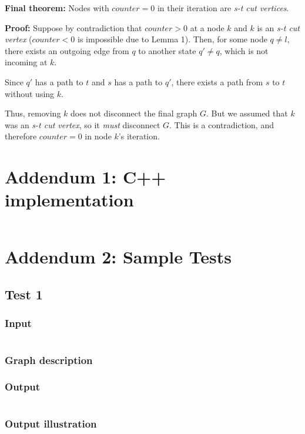 \documentclass{article}
\begin{document}
\begin{itemize}
\textbf{Final theorem:} Nodes with $counter = 0$ in their iteration are \emph{s-t cut vertices}.

\textbf{Proof:} Suppose by contradiction that $counter > 0$ at a node $k$ and $k$ is an \emph{s-t cut vertex} ($counter < 0$ is impossible due to Lemma 1). Then, for some node $q \neq l$, there exists an outgoing edge from $q$ to another state $q' \neq q$, which is not incoming at $k$.

Since $q'$ has a path to $t$ and $s$ has a path to $q'$, there exists a path from $s$ to $t$ without using $k$. 

Thus, removing $k$ does not disconnect the final graph $G$. But we assumed that $k$ was an \emph{s-t cut vertex}, so it \emph{must} disconnect $G$. This is a contradiction, and therefore $counter = 0$ in node $k$'s iteration.

\end{itemize}



\section*{Addendum 1: C++ implementation}

\inputminted{cpp}{stcut.cpp}

\newpage
\section*{Addendum 2: Sample Tests}

\subsection{Test 1}
\subsubsection*{Input}
\inputminted{sh}{./in1}
\subsubsection*{Graph description}

\subsubsection*{Output}
\inputminted{sh}{./out1}
\subsubsection*{Output illustration}

\end{document}
